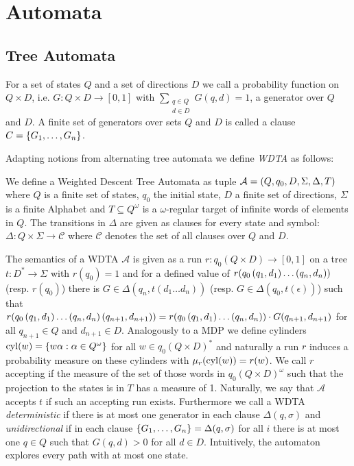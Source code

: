 \chapter{Automata}
\section{Tree Automata}
\begin{definition}[Generator]
  For a set of states $Q$ and a set of directions $D$ we call a probability
  function on $Q\times D$, i.e. $G: Q\times D\rightarrow [0,1]$ with
  $\sum\limits_{\substack{q\in Q\\ d\in D}}G(q,d) = 1$, a generator over $Q$
  and $D$. A finite set of generators over sets $Q$ and $D$ is called a clause
  $C = \left\{G_{1},\dots,G_{n}\right\}$.
\end{definition}
Adapting notions from alternating tree automata we define \emph{\ac{WDTA}} as
follows:
\begin{definition}
  We define a Weighted Descent Tree Automata as tuple
  $\mathcal{A} = \left(Q, q_{0}, D, \Sigma, \Delta, T\right)$ where $Q$ is a finite
  set of states, $q_{0}$ the initial state, $D$ a finite set of directions,
  $\Sigma$ is a finite Alphabet and $T\subseteq Q^{\omega}$ is a
  $\omega$-regular target of infinite words of elements in $Q$. The transitions
  in $\Delta$ are given as clauses for every state and symbol:
  $\Delta:Q\times\Sigma\rightarrow\mathcal{C}$
  where $\mathcal{C}$ denotes the set of all clauses over $Q$ and $D$.
\end{definition}
The semantics of a \ac{WDTA} $\mathcal{A}$ is given as a run
$r:q_{0}(Q\times D)\rightarrow [0,1]$ on a tree
$t:D^{*}\rightarrow\Sigma$ with $r(q_{0}) = 1$ and for a defined value
of $r(q_{0}\left(q_{1}, d_{1}\right)\dots\left(q_{n}, d_{n}\right))$ (resp. $r(q_{0})$)
there is $G\in\Delta(q_{n}, t(d_{1}\dots d_{n}))$ (resp. $G\in\Delta(q_{0},
t(\epsilon))$) such that
$r(q_{0}\left(q_{1}, d_{1}\right)\dots\left(q_{n}, d_{n}\right)\left(q_{n+1}, d_{n+1}\right))
= r(q_{0}\left(q_{1}, d_{1}\right)\dots\left(q_{n}, d_{n}\right))\cdot G(q_{n+1}, d_{n+1})$
for all $q_{n+1}\in Q$ and $d_{n+1}\in D$. Analogously to a \ac{MDP} we define
cylinders $\operatorname{cyl}(w) = \left\{w\alpha : \alpha\in Q^{\omega}\right\}$ for all
$w\in q_{0}(Q\times D)^{*}$ and naturally a run $r$ induces a
probability measure on these cylinders with $\mu_{r}(\operatorname{cyl}(w)) = r(w)$. We call
$r$ accepting if the measure of the set of those words in
$q_{0}(Q\times D)^{\omega}$ such that the projection to the states is in $T$
has a measure of 1. Naturally, we say that $\mathcal{A}$ accepts $t$ if such an
accepting run exists. Furthermore we call a \ac{WDTA} \emph{deterministic} if
there is at most one generator in each clause $\Delta(q, \sigma)$ and
\emph{unidirectional} if in each clause
$\left\{G_{1},\dots,G_{n}\right\} = \Delta(q, \sigma)$ for all $i$ there is at most one
$q\in Q$ such that $G(q, d) > 0$ for all $d\in D$. Intuitively, the automaton
explores every path with at most one state.

